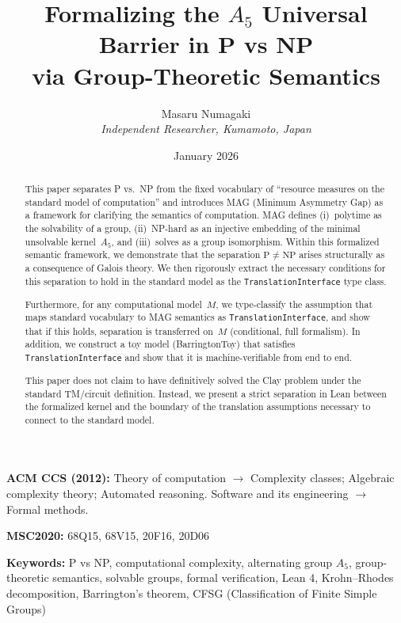 \documentclass[11pt,a4paper]{article}
\title{Formalizing the $A_5$ Universal Barrier in P vs NP\\
via Group-Theoretic Semantics}
\author{Masaru Numagaki\\
\textit{Independent Researcher, Kumamoto, Japan}}
\date{January 2026}
\theoremstyle{plain}
\theoremstyle{definition}
\newcommand{\Aalt}{A_5}
\newcommand{\TranslationInterface}{\texttt{TranslationInterface}}
\begin{document}
\maketitle

\noindent\textbf{ACM CCS (2012):}
Theory of computation $\rightarrow$ Complexity classes; Algebraic complexity theory; Automated reasoning.
Software and its engineering $\rightarrow$ Formal methods.

\noindent\textbf{MSC2020:} 68Q15, 68V15, 20F16, 20D06

\noindent\textbf{Keywords:} P vs NP, computational complexity, alternating group $A_5$, 
group-theoretic semantics, solvable groups, formal verification, Lean 4, 
Krohn–Rhodes decomposition, Barrington’s theorem, CFSG (Classification of Finite Simple Groups)

\vspace{1em}

\tableofcontents
\newpage
\begin{abstract}
This paper separates P vs.\ NP from the fixed vocabulary of ``resource measures on the standard model of computation'' and introduces MAG (Minimum Asymmetry Gap) as a framework for clarifying the semantics of computation. MAG defines (i)~polytime as the solvability of a group, (ii)~NP-hard as an injective embedding of the minimal unsolvable kernel~$\Aalt$, and (iii)~solves as a group isomorphism. Within this formalized semantic framework, we demonstrate that the separation $\mathrm{P} \neq \mathrm{NP}$ arises structurally as a consequence of Galois theory.
 We then rigorously extract the necessary conditions for this separation to hold in the standard model as the \TranslationInterface{} type class.

Furthermore, for any computational model~$M$, we type-classify the assumption that maps standard vocabulary to MAG semantics as \TranslationInterface{}, and show that if this holds, separation is transferred on~$M$ (conditional, full formalism). In addition, we construct a toy model (BarringtonToy) that satisfies \TranslationInterface{} and show that it is machine-verifiable from end to end.

This paper does not claim to have definitively solved the Clay problem under the standard TM/circuit definition. Instead, we present a strict separation in Lean between the formalized kernel and the boundary of the translation assumptions necessary to connect to the standard model.
\end{abstract}
\end{document}
